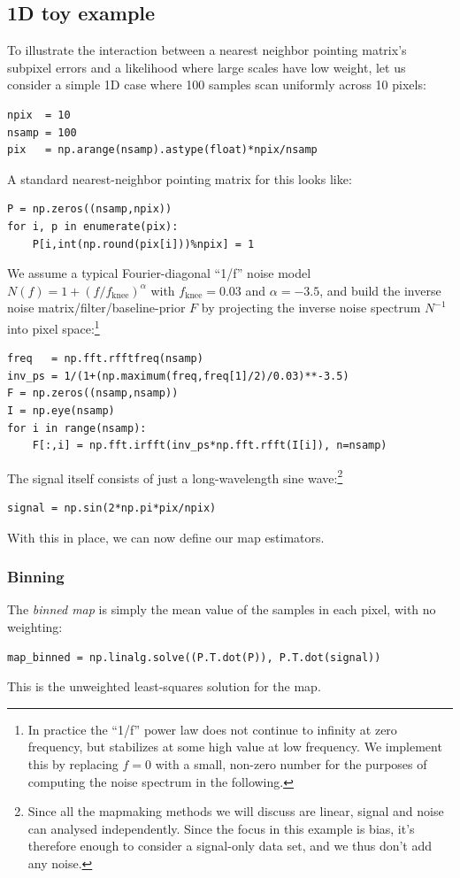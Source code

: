 \documentclass[twocolumn,apj]{aastex63}
\begin{document}
\subsection{1D toy example}
To illustrate the interaction between a nearest neighbor pointing matrix's
subpixel errors and a likelihood where large scales have low weight, let
us consider a simple 1D case where 100 samples scan uniformly across 10 pixels:
\begin{lstlisting}
npix  = 10
nsamp = 100
pix   = np.arange(nsamp).astype(float)*npix/nsamp
\end{lstlisting}
A standard nearest-neighbor pointing matrix for this looks like:
\begin{lstlisting}
P = np.zeros((nsamp,npix))
for i, p in enumerate(pix):
	P[i,int(np.round(pix[i]))%npix] = 1
\end{lstlisting}
We assume a typical Fourier-diagonal ``1/f'' noise model
$N(f) = 1+(f/f_\text{knee})^\alpha$
with $f_\text{knee}=0.03$ and $\alpha=-3.5$, and build the
inverse noise matrix/filter/baseline-prior $F$ by
projecting the inverse noise spectrum $N^{-1}$ into pixel space:\footnote{
	In practice the ``1/f'' power law does not continue to infinity at zero
	frequency, but stabilizes at some high value at low frequency. We implement
	this by replacing $f=0$ with a small, non-zero number for the purposes of
	computing the noise spectrum in the following.
}
\begin{lstlisting}
freq   = np.fft.rfftfreq(nsamp)
inv_ps = 1/(1+(np.maximum(freq,freq[1]/2)/0.03)**-3.5)
F = np.zeros((nsamp,nsamp))
I = np.eye(nsamp)
for i in range(nsamp):
	F[:,i] = np.fft.irfft(inv_ps*np.fft.rfft(I[i]), n=nsamp)
\end{lstlisting}
The signal itself consists of just a long-wavelength sine wave:\footnote{
Since all the mapmaking methods we will discuss are linear,
signal and noise can analysed independently. Since the focus
in this example is bias, it's therefore enough to consider a
signal-only data set, and we thus don't add any noise.}
\begin{lstlisting}
signal = np.sin(2*np.pi*pix/npix)
\end{lstlisting}

With this in place, we can now define our map estimators.

\subsubsection{Binning}
The \emph{binned map} is simply the mean value of the samples
in each pixel, with no weighting:
\begin{lstlisting}
map_binned = np.linalg.solve((P.T.dot(P)), P.T.dot(signal))
\end{lstlisting}
This is the unweighted least-squares solution for the map.
\end{document}
